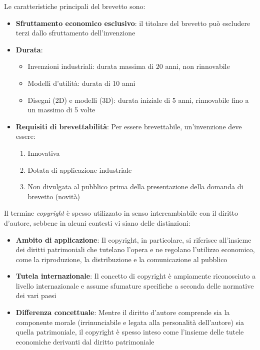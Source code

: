 \documentclass[8pt,oneside,a4paper]{article}
\begin{document}
	Le caratteristiche principali del brevetto sono:
	\begin{itemize}
		\item \textbf{Sfruttamento economico esclusivo}: il titolare del brevetto può escludere terzi dallo sfruttamento dell'invenzione
		\item \textbf{Durata}:
		\begin{itemize}
			\item Invenzioni industriali: durata massima di 20 anni, non rinnovabile
			\item Modelli d'utilità: durata di 10 anni
			\item Disegni (2D) e modelli (3D): durata iniziale di 5 anni, rinnovabile fino a un massimo di 5 volte
		\end{itemize}
		\item \textbf{Requisiti di brevettabilità}:  
		Per essere brevettabile, un'invenzione deve essere:
		\begin{enumerate}
			\item Innovativa
			\item Dotata di applicazione industriale
			\item Non divulgata al pubblico prima della presentazione della domanda di brevetto (novità)
		\end{enumerate}
	\end{itemize}
	Il termine \textit{copyright} è spesso utilizzato in senso intercambiabile con il diritto d'autore, sebbene in alcuni contesti vi siano delle distinzioni:
	\begin{itemize}
		\item \textbf{Ambito di applicazione}:  
		Il copyright, in particolare, si riferisce all'insieme dei diritti patrimoniali che tutelano l'opera e ne regolano l'utilizzo economico, come la riproduzione, la distribuzione e la comunicazione al pubblico
		\item \textbf{Tutela internazionale}:  
		Il concetto di copyright è ampiamente riconosciuto a livello internazionale e assume sfumature specifiche a seconda delle normative dei vari paesi
		\item \textbf{Differenza concettuale}:  
		Mentre il diritto d'autore comprende sia la componente morale (irrinunciabile e legata alla personalità dell'autore) sia quella patrimoniale, il copyright è spesso inteso come l'insieme delle tutele economiche derivanti dal diritto patrimoniale
	\end{itemize}
\end{document}
